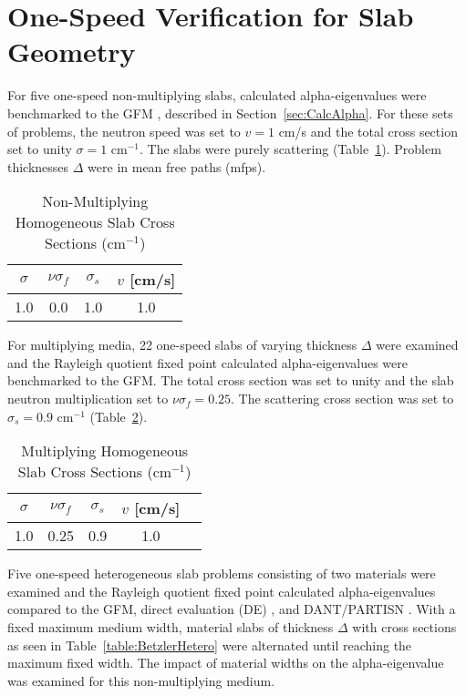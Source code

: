 \section{One-Speed Verification for Slab Geometry}

For five one-speed non-multiplying slabs, calculated alpha-eigenvalues were benchmarked to the GFM \cite{kornreich_timeeigenvalue_2005}, described in Section~\ref{sec:CalcAlpha}. For these sets of problems, the neutron speed was set to $v = 1$ cm/s and the total cross section set to unity $\sigma = 1$ cm$^{-1}$. The slabs were purely scattering (Table~\ref{table:Betzler}). Problem thicknesses $\Delta$ were in mean free paths (mfps).

\begin{table}[H]
    \centering
    \caption{Non-Multiplying Homogeneous Slab Cross Sections (cm$^{-1}$)}
\label{table:Betzler}
    \begin{tabular}{*4c}
        \toprule
	$\sigma$ & $\nu \sigma_{f}$ & $\sigma_{s}$  & $v$ [cm/s] \\ 
        \midrule
	1.0 & 0.0 & 1.0 & 1.0 \\
        \bottomrule
    \end{tabular}
\end{table}

For multiplying media, 22 one-speed slabs of varying thickness $\Delta$ were examined and the Rayleigh quotient fixed point calculated alpha-eigenvalues were benchmarked to the GFM. The total cross section was set to unity and the slab neutron multiplication set to $\nu \sigma_{f} = 0.25$. The scattering cross section was set to $\sigma_{s} = 0.9$ cm$^{-1}$ (Table~\ref{table:Betzler2}).

\begin{table}[H]
    \centering
    \caption{Multiplying Homogeneous Slab Cross Sections (cm$^{-1}$)}
\label{table:Betzler2}
    \begin{tabular}{*5c}
        \toprule
	$\sigma$ & $\nu \sigma_{f}$ & $\sigma_{s}$ & $v$ [cm/s] \\ 
        \midrule
	1.0 & 0.25 & 0.9 & 1.0 \\
        \bottomrule
    \end{tabular}
\end{table}

Five one-speed heterogeneous slab problems consisting of two materials were examined and the Rayleigh quotient fixed point calculated alpha-eigenvalues compared to the GFM, direct evaluation (DE) \cite{modak_simple_2003}, and DANT/PARTISN \cite{alcouffe2005partisn}. With a fixed maximum medium width, material slabs of thickness $\Delta$ with cross sections as seen in Table~\ref{table:BetzlerHetero} were alternated until reaching the maximum fixed width. The impact of material widths on the alpha-eigenvalue was examined for this non-multiplying medium.

